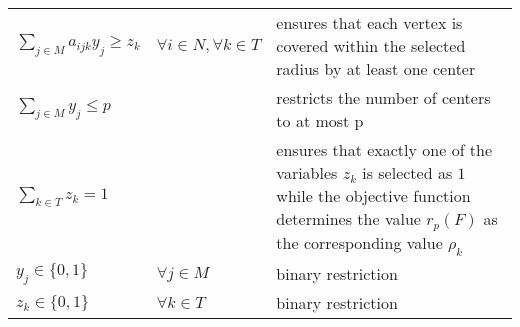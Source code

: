 \renewcommand{\arraystretch}{2}
\begin{tabularx}{\textwidth}{l l X}
$\sum\limits_{j \in M} a_{ijk} y_j \geq z_k$ & $\forall i \in N, \forall k \in T$ & ensures that each vertex is covered within the selected radius by at least one center \\
$\sum\limits_{j \in M} y_j \leq p$ & & restricts the number of centers to at most p \\
$\sum\limits_{k \in T} z_k = 1$ & & ensures that exactly one of the variables $z_k$ is selected as $1$ while the objective function determines the value $r_p(F)$ as the corresponding value $\rho_k$ \\
$y_{j} \in \lbrace 0, 1\rbrace$ & $\forall j \in M$ & binary restriction \\
$z_k \in \lbrace 0, 1\rbrace$ & $\forall k \in T$ & binary restriction 
\end{tabularx}